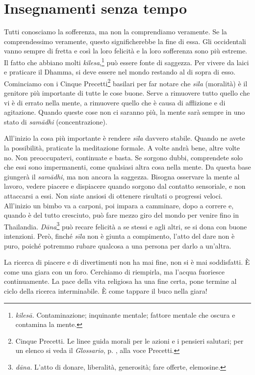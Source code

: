\chapter{Insegnamenti senza tempo}

Tutti conosciamo la sofferenza, ma non la comprendiamo veramente. Se la
comprendessimo veramente, questo significherebbe la fine di essa. Gli
occidentali vanno sempre di fretta e così la loro felicità e la loro
sofferenza sono più estreme. Il fatto che abbiano molti
\emph{kilesa},\footnote{\emph{kilesā.} Contaminazione; inquinante
  mentale; fattore mentale che oscura e contamina la mente.} può essere
fonte di saggezza. Per vivere da laici e praticare il Dhamma, si deve
essere nel mondo restando al di sopra di esso. Cominciamo con i Cinque
Precetti\footnote{Cinque Precetti. Le linee guida morali per le azioni e
  i pensieri salutari; per un elenco si veda il \emph{Glossario}, p. \pageref{glossary-precetti}, alla
  voce Precetti.} basilari per far notare che \emph{sīla} (moralità)
è il genitore più importante di tutte le
cose buone. Serve a rimuovere tutto quello che vi è di errato nella
mente, a rimuovere quello che è causa di afflizione e di agitazione.
Quando queste cose non ci saranno più, la mente sarà sempre in uno stato
di \emph{samādhi} (concentrazione).

All'inizio la cosa più importante è rendere \emph{sīla} davvero stabile.
Quando ne avete la possibilità, praticate la meditazione formale. A
volte andrà bene, altre volte no. Non preoccupatevi, continuate e basta.
Se sorgono dubbi, comprendete solo che essi sono impermanenti, come
qualsiasi altra cosa nella mente. Da questa base giungerà il
\emph{samādhi}, ma non ancora la saggezza. Bisogna osservare la mente al
lavoro, vedere piacere e dispiacere quando sorgono dal contatto
sensoriale, e non attaccarsi a essi. Non siate ansiosi di ottenere
risultati o progressi veloci. All'inizio un bimbo va a carponi, poi
impara a camminare, dopo a correre e, quando è del tutto cresciuto, può
fare mezzo giro del mondo per venire fino in Thailandia.
\emph{Dāna}\footnote{\emph{dāna.} L'atto di donare, liberalità,
  generosità; fare offerte, elemosine.} può recare felicità a se stessi
e agli altri, se si dona con buone intenzioni. Però, finché \emph{sīla}
non è giunta a compimento, l'atto del dare non è puro, poiché potremmo
rubare qualcosa a una persona per darlo a un'altra.

La ricerca di piacere e di divertimenti non ha mai fine, non si è mai
soddisfatti. È come una giara con un foro. Cerchiamo di riempirla, ma
l'acqua fuoriesce continuamente. La pace della vita religiosa ha una
fine certa, pone termine al ciclo della ricerca interminabile. È come
tappare il buco nella giara!

